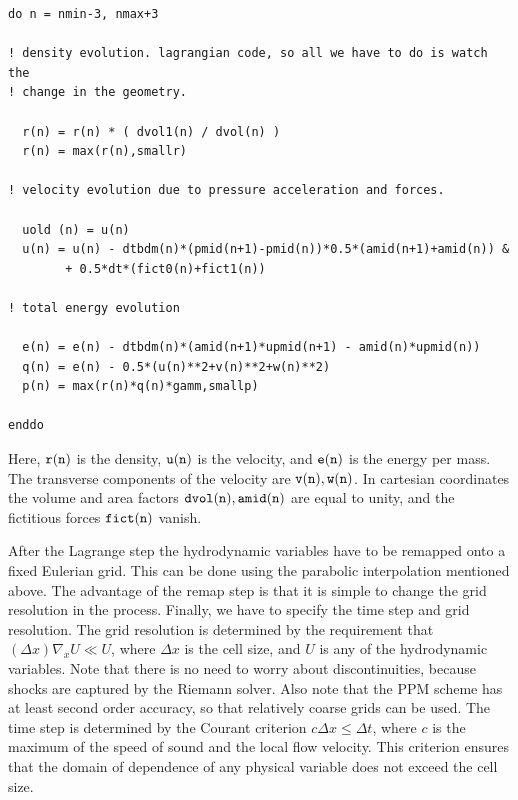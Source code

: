 \vspace*{0.3cm} 
\begin{lstlisting}
do n = nmin-3, nmax+3

! density evolution. lagrangian code, so all we have to do is watch the 
! change in the geometry.

  r(n) = r(n) * ( dvol1(n) / dvol(n) )
  r(n) = max(r(n),smallr)

! velocity evolution due to pressure acceleration and forces.

  uold (n) = u(n)
  u(n) = u(n) - dtbdm(n)*(pmid(n+1)-pmid(n))*0.5*(amid(n+1)+amid(n)) &
        + 0.5*dt*(fict0(n)+fict1(n)) 

! total energy evolution

  e(n) = e(n) - dtbdm(n)*(amid(n+1)*upmid(n+1) - amid(n)*upmid(n))  
  q(n) = e(n) - 0.5*(u(n)**2+v(n)**2+w(n)**2)
  p(n) = max(r(n)*q(n)*gamm,smallp)

enddo
\end{lstlisting}

\vspace*{0.3cm} 
Here, ${\tt r(n)}$ is the density, ${\tt u(n)}$ is the velocity, 
and ${\tt e(n)}$ is the energy per mass. The transverse components
of the velocity are ${\tt v(n),w(n)}$. In cartesian coordinates
the volume and area factors ${\tt dvol(n),amid(n)}$ are equal to unity, 
and  the fictitious forces ${\tt fict(n)}$ vanish.

 After the Lagrange step the hydrodynamic variables have to be remapped
onto a fixed Eulerian grid. This can be done using the parabolic interpolation 
mentioned above. The advantage of the remap step is that it is simple to 
change the grid resolution in the process. Finally, we have to specify the 
time step and grid resolution. The grid resolution is determined by the 
requirement that $(\Delta x)\nabla_x U\ll U$, where $\Delta x$ is the cell 
size, and $U$ is any of the hydrodynamic variables. Note that there is 
no need to worry about discontinuities, because shocks are captured by 
the Riemann solver. Also note that the PPM scheme has at least second 
order accuracy, so that relatively coarse grids can be used. The time 
step is determined by the Courant criterion $c\Delta x \leq \Delta t$, 
where $c$ is the maximum of the speed of sound and the local flow velocity. 
This criterion ensures that the domain of dependence of any physical
variable does not exceed the cell size. 

